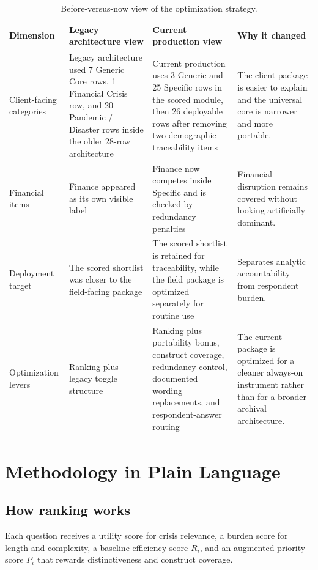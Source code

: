 \documentclass[12pt]{article}
\begin{document}
\begin{table}[H]
\centering
\small
\begin{tabularx}{\textwidth}{L{0.19\textwidth} Y Y Y}
\toprule
Dimension & Legacy architecture view & Current production view & Why it changed \\
\midrule
Client-facing categories & Legacy architecture used 7 Generic Core rows, 1 Financial Crisis row, and 20 Pandemic / Disaster rows inside the older 28-row architecture & Current production uses 3 Generic and 25 Specific rows in the scored module, then 26 deployable rows after removing two demographic traceability items & The client package is easier to explain and the universal core is narrower and more portable. \\
Financial items & Finance appeared as its own visible label & Finance now competes inside Specific and is checked by redundancy penalties & Financial disruption remains covered without looking artificially dominant. \\
Deployment target & The scored shortlist was closer to the field-facing package & The scored shortlist is retained for traceability, while the field package is optimized separately for routine use & Separates analytic accountability from respondent burden. \\
Optimization levers & Ranking plus legacy toggle structure & Ranking plus portability bonus, construct coverage, redundancy control, documented wording replacements, and respondent-answer routing & The current package is optimized for a cleaner always-on instrument rather than for a broader archival architecture. \\
\bottomrule
\end{tabularx}
\caption{Before-versus-now view of the optimization strategy.}
\end{table}

\section{Methodology in Plain Language}

\subsection{How ranking works}

Each question receives a utility score for crisis relevance, a burden score for length and complexity, a baseline efficiency score $R_i$, and an augmented priority score $P_i$ that rewards distinctiveness and construct coverage.
\end{document}
